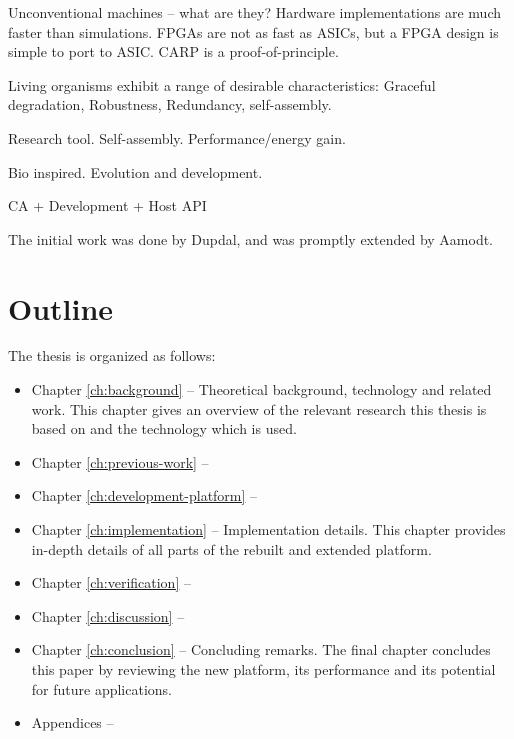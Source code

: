 \TODO
Unconventional machines – what are they?
Hardware implementations are much faster than simulations.
FPGAs are not as fast as ASICs, but a FPGA design is simple to port to ASIC.
CARP is a proof-of-principle.

Living organisms exhibit a range of desirable characteristics:
Graceful degradation, Robustness, Redundancy, self-assembly.

Research tool.
Self-assembly.
Performance/energy gain.

Bio inspired.
Evolution and development.

CA + Development + Host API


The initial work was done by Dupdal, and was promptly extended by Aamodt.

\section{Outline}

\TODO
The thesis is organized as follows:

\begin{itemize}
    \item Chapter \ref{ch:background} –
        Theoretical background, technology and related work.
        This chapter gives an overview of the relevant research this thesis is based on and the technology which is used.
    \item Chapter \ref{ch:previous-work} –
        \TODO
    \item Chapter \ref{ch:development-platform} –
        \TODO
    \item Chapter \ref{ch:implementation} –
        Implementation details.
        This chapter provides in-depth details of all parts of the rebuilt and extended platform.
        \TODO
    \item Chapter \ref{ch:verification} –
        \TODO
    \item Chapter \ref{ch:discussion} –
        \TODO
    \item Chapter \ref{ch:conclusion} –
        Concluding remarks.
        The final chapter concludes this paper by reviewing the new platform, its performance and its potential for future applications.
    \item Appendices –
        \TODO
\end{itemize}
